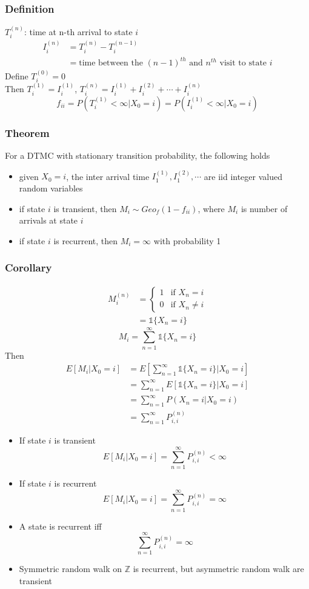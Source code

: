 \documentclass[11pt]{article}
\newcommand{\Z}{{\mathbb{Z}}}
\newcommand{\dso}{\mathds{1}}
\begin{document}
\subsubsection*{Definition}
$T_i^{(n)}$: time at n-th arrival to state $i$ 
\begin{align*} 
    I_i^{(n)} &= T_i^{(n)} - T_i^{(n-1)} \\
    &= \text{time between the } (n-1)^{th} \text{ and } n^{th} \text{ visit to state } i
\end{align*}
Define $T_i^{(0)}=0$ \\
Then $T_i^{(1)} = I_i^{(1)}$, $T_i^{(n)} = I_i^{(1)} + I_i^{(2)} + \cdots + I_i^{(n)}$ 
\[f_{ii} = P(T_i^{(1)}<\infty|X_0=i) = P(I_i^{(1)}<\infty|X_0=i)\]   
\subsubsection*{Theorem}
For a DTMC with stationary transition probability, the following holds
\begin{itemize}
    \item given $X_0=i$, the inter arrival time $I_1^{(1)}, I_1^{(2)},\cdots$ are iid integer valued random variables 
    \item if state $i$ is transient, then $M_i\sim Geo_f(1-f_{ii})$, where $M_i$ is number of arrivals at state $i$ 
    \item if state $i$ is recurrent, then $M_i = \infty$ with probability 1 
\end{itemize}
\subsubsection*{Corollary}
\begin{align*}
    M_i^{(n)} &= 
    \begin{cases}
        1 &\text{if } X_n=i \\
        0 &\text{if } X_n\neq i 
    \end{cases} \\
    &= \dso \{X_n=i\}
\end{align*}
\[M_i = \sum_{n=1}^{\infty}\dso \{X_n=i\}\]
Then 
\begin{align*}
    E[M_i|X_0=i] &= E\left[\sum_{n=1}^{\infty}\dso \{X_n=i\}|X_0=i\right] \\
                 &= \sum_{n=1}^{\infty}E\left[\dso \{X_n=i\}|X_0=i\right] \\
                 &= \sum_{n=1}^{\infty}P(X_n = i|X_0=i) \\
                 &= \sum_{n=1}^{\infty}P_{i,i}^{(n)}
\end{align*}
\begin{itemize}
    \item If state $i$ is transient \[E[M_i|X_0=i] = \sum_{n=1}^{\infty}P_{i,i}^{(n)} < \infty\]
    \item If state $i$ is recurrent \[E[M_i|X_0=i] = \sum_{n=1}^{\infty}P_{i,i}^{(n)} = \infty\]
    \item A state is recurrent iff \[\sum_{n=1}^{\infty}P_{i,i}^{(n)} = \infty\] 
    \item Symmetric random walk on $\Z$ is recurrent, but asymmetric random walk are transient 
\end{itemize}
\end{document}
